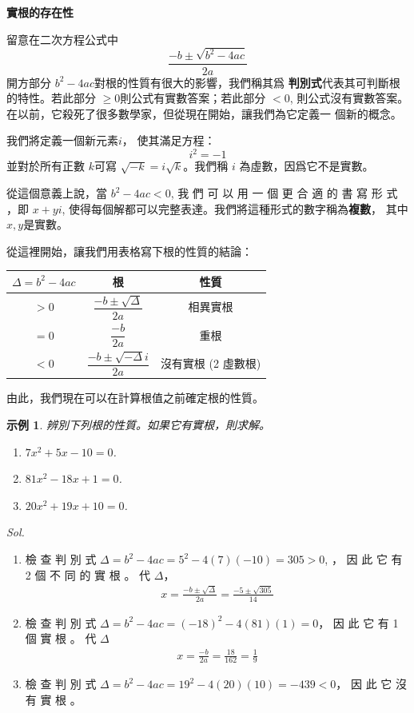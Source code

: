 \documentclass[12pt]{article}
\newtheorem{example}{示例}
\begin{document}
    \begin{center}
        \textbf{實根的存在性}
    \end{center}

    留意在二次方程公式中 $$\frac{-b\pm \sqrt{b^2-4ac}}{2a}$$ 開方部分 $b^2-4ac$對根的性質有很大的影響，我們稱其爲 \textbf{判別式}代表其可判斷根的特性。若此部分 $\geq 0$則公式有實數答案；若此部分 $< 0$, 則公式沒有實數答案。 在以前，它殺死了很多數學家，但從現在開始，讓我們為它定義一
    個新的概念。

    我們將定義一個新元素$i$， 使其滿足方程： $$i^2=-1$$ 並對於所有正數 $k$可寫 $\sqrt{-k}=i\sqrt{k}$。我們稱 $i$ 為虛數，因爲它不是實數。

    從這個意義上說，當 $b^2-4ac<0$, 我 們 可 以 用 一 個 更 合 適 的 書 寫 形 式 ，即 $x+yi$, 使得每個解都可以完整表達。我們將這種形式的數字稱為\textbf{複數}， 其中$x, y$是實數。

    從這裡開始，讓我們用表格寫下根的性質的結論：

    \begin{center}
        \begin{tabular}{|c|c|c|}
            \hline
            $\Delta=b^2-4ac$&根&性質\\
            \hline
            $>0$&$\dfrac{-b\pm\sqrt{\Delta}}{2a}$&相異實根\\
            \hline
            $=0$&$\dfrac{-b}{2a}$&重根\\
            \hline
            $<0$&$\dfrac{-b\pm\sqrt{-\Delta}i}{2a}$&沒有實根 (2 虛數根)\\
            \hline
        \end{tabular}
    \end{center}

    由此，我們現在可以在計算根值之前確定根的性質。
    \begin{example}
        辨別下列根的性質。如果它有實根，則求解。\begin{enumerate}
            \item[(a)] $7x^2+5x-10=0$.
            \item[(b)] $81x^2-18x+1=0$.
            \item[(c)] $20x^2+19x+10=0$.
        \end{enumerate}
    \end{example}

    \textit{ Sol.}\begin{enumerate}
        \item[(a)] 檢 查 判 別 式 $\Delta=b^2-4ac=5^2-4(7)(-10)=305>0$, ， 因 此 它 有 2 個 不 同 的 實 根 。 代 $\Delta$， \begin{align*}
            x=\frac{-b\pm\sqrt{\Delta}}{2a}=\frac{-5\pm\sqrt{305}}{14}
        \end{align*}
        \item[(b)] 檢 查 判 別 式 $\Delta=b^2-4ac=(-18)^2-4(81)(1)=0$， 因 此 它 有 1 個 實 根 。 代 $\Delta$\begin{align*}
            x=\frac{-b}{2a}=\frac{18}{162}=\frac{1}{9}
        \end{align*}
        \item[(c)] 檢 查 判 別 式 $\Delta=b^2-4ac=19^2-4(20)(10)=-439<0$， 因 此 它 沒 有 實 根 。
    \end{enumerate}
\end{document}
